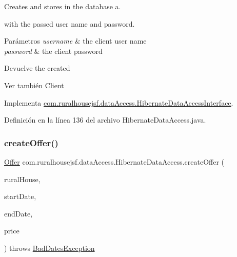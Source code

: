Creates and stores in the database a. 


\begin{DoxyCode}{0}
\end{DoxyCode}
 with the passed user name and password.


\begin{DoxyParams}{Parámetros}
{\em username} & the client user name \\
\hline
{\em password} & the client password\\
\hline
\end{DoxyParams}
\begin{DoxyReturn}{Devuelve}
the created
\begin{DoxyCode}{0}
\end{DoxyCode}

\end{DoxyReturn}
\begin{DoxySeeAlso}{Ver también}
Client 
\end{DoxySeeAlso}


Implementa \mbox{\hyperlink{interfacecom_1_1ruralhousejsf_1_1data_access_1_1_hibernate_data_access_interface_a4671ad8ff75ef8a9195974dbdcd95e7f}{com.\+ruralhousejsf.\+data\+Access.\+Hibernate\+Data\+Access\+Interface}}.



Definición en la línea 136 del archivo Hibernate\+Data\+Access.\+java.

\mbox{\label{classcom_1_1ruralhousejsf_1_1data_access_1_1_hibernate_data_access_a332f591a06df13d36814ff215008987b}} 
\subsubsection{\texorpdfstring{createOffer()}{createOffer()}\hspace{0.1cm}{\footnotesize\ttfamily [1/2]}}
{\footnotesize\ttfamily \mbox{\hyperlink{classcom_1_1ruralhousejsf_1_1domain_1_1_offer}{Offer}} com.\+ruralhousejsf.\+data\+Access.\+Hibernate\+Data\+Access.\+create\+Offer (\begin{DoxyParamCaption}\item[{\mbox{\hyperlink{classcom_1_1ruralhousejsf_1_1domain_1_1_rural_house}{Rural\+House}}}]{rural\+House,  }\item[{Local\+Date}]{start\+Date,  }\item[{Local\+Date}]{end\+Date,  }\item[{double}]{price }\end{DoxyParamCaption}) throws \mbox{\hyperlink{classcom_1_1ruralhousejsf_1_1exceptions_1_1_bad_dates_exception}{Bad\+Dates\+Exception}}}



